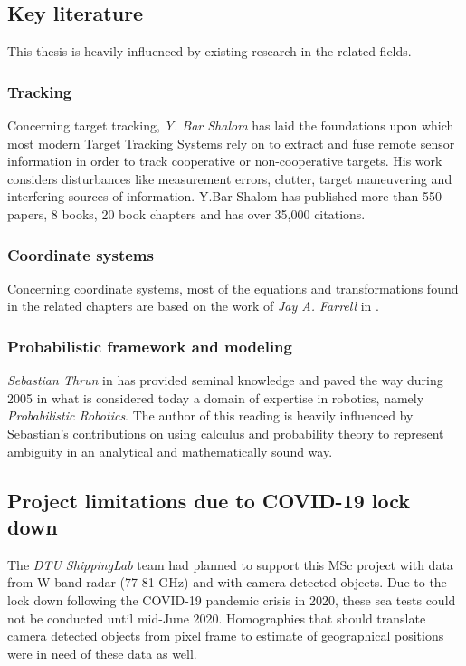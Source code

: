 \subsection{Key literature}

This thesis is heavily influenced by existing research in the related fields.
\subsubsection{Tracking}
Concerning target tracking,  \emph{Y. Bar Shalom} \Cite{BarShalom1980,Shalom1990,Shalom2001} has laid the foundations upon which most modern Target Tracking Systems rely on to extract and fuse remote sensor information in order to track cooperative or non-cooperative targets. His work considers disturbances like measurement errors, clutter, target maneuvering and interfering sources of information.  Y.Bar-Shalom has published more than 550 papers, 8 books, 20 book chapters and has over 35,000 citations. \\
\subsubsection{Coordinate systems}
Concerning coordinate systems, most of the equations and transformations found in the related chapters are based on the work of \emph{Jay A. Farrell} in \cite{Farrell2008}.\\

\subsubsection{Probabilistic framework and modeling}
\emph{Sebastian Thrun} in \cite{Thrun2005} has provided seminal knowledge and paved the way during 2005 in what is considered today a domain of expertise in robotics, namely \emph{Probabilistic Robotics}. The author of this reading is heavily influenced by Sebastian's contributions on using calculus and probability theory to represent ambiguity in an analytical and mathematically sound way. 

\subsection{Project limitations due to COVID-19 lock down}
The \emph{DTU ShippingLab} team had planned to support this MSc project with data from W-band radar (77-81 GHz) and with camera-detected objects. Due to the lock down following the COVID-19 pandemic crisis in 2020, these sea tests could not be conducted until mid-June 2020. Homographies that should translate camera detected objects from pixel frame to estimate of geographical positions were in need of these data as well. 


